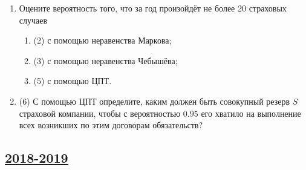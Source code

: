 \begin{enumerate}
  \begin{enumerate}
  \item Оцените вероятность того, что за год произойдёт не более 20 страховых случаев
         \begin{enumerate}
         \item (2) с помощью неравенства Маркова;
         \item (3) с помощью неравенства Чебышёва;
         \item (5) с помощью ЦПТ.
         \end{enumerate}
  \item (6) С помощью ЦПТ определите, каким должен быть совокупный резерв $S$ страховой компании, 
  чтобы с вероятностью $0.95$ его хватило на выполнение всех возникших по этим договорам обязательств?
         
  \end{enumerate}
  \end{enumerate}
  





\subsection[2018-2019]{\hyperref[sec:sol_kr_02_2018_2019]{2018-2019}}
\label{sec:kr_02_2018_2019}

